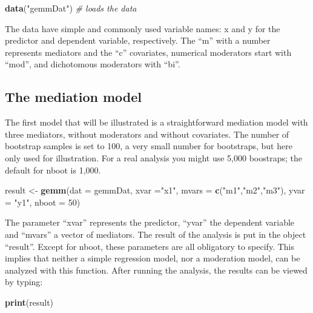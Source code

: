 \documentclass[man,floatsintext]{apa6}
\newenvironment{Shaded}{\begin{snugshade}}{\end{snugshade}}
\newcommand{\KeywordTok}[1]{\textcolor[rgb]{0.13,0.29,0.53}{\textbf{#1}}}
\newcommand{\DataTypeTok}[1]{\textcolor[rgb]{0.13,0.29,0.53}{#1}}
\newcommand{\DecValTok}[1]{\textcolor[rgb]{0.00,0.00,0.81}{#1}}
\newcommand{\StringTok}[1]{\textcolor[rgb]{0.31,0.60,0.02}{#1}}
\newcommand{\CommentTok}[1]{\textcolor[rgb]{0.56,0.35,0.01}{\textit{#1}}}
\newcommand{\NormalTok}[1]{#1}
\theoremstyle{definition}
\theoremstyle{definition}
\theoremstyle{definition}
\theoremstyle{remark}
\begin{document}
\begin{Shaded}
\begin{Highlighting}[]
\KeywordTok{data}\NormalTok{(}\StringTok{"gemmDat"}\NormalTok{)          }\CommentTok{# loads the data}
\end{Highlighting}
\end{Shaded}

The data have simple and commonly used variable names: x and y for the
predictor and dependent variable, respectively. The \enquote{m} with a
number represents mediators and the \enquote{c} covariates, numerical
moderators start with \enquote{mod}, and dichotomous moderators with
\enquote{bi}.

\subsection{The mediation model}\label{the-mediation-model}

The first model that will be illustrated is a straightforward mediation
model with three mediators, without moderators and without covariates.
The number of bootstrap samples is set to 100, a very small number for
bootstraps, but here only used for illustration. For a real analysis you
might use 5,000 boostraps; the default for nboot is 1,000.

\begin{Shaded}
\begin{Highlighting}[]
\NormalTok{result <-}\StringTok{ }\KeywordTok{gemm}\NormalTok{(}\DataTypeTok{dat =}\NormalTok{ gemmDat, }
               \DataTypeTok{xvar =}\StringTok{"x1"}\NormalTok{, }
               \DataTypeTok{mvars =} \KeywordTok{c}\NormalTok{(}\StringTok{"m1"}\NormalTok{,}\StringTok{"m2"}\NormalTok{,}\StringTok{"m3"}\NormalTok{),}
               \DataTypeTok{yvar =} \StringTok{"y1"}\NormalTok{,}
               \DataTypeTok{nboot =} \DecValTok{50}\NormalTok{)}
\end{Highlighting}
\end{Shaded}

The parameter \enquote{xvar} represents the predictor, \enquote{yvar}
the dependent variable and \enquote{mvars} a vector of mediators. The
result of the analysis is put in the object \enquote{result}. Except for
nboot, these parameters are all obligatory to specify. This implies that
neither a simple regression model, nor a moderation model, can be
analyzed with this function. After running the analysis, the results can
be viewed by typing:

\begin{Shaded}
\begin{Highlighting}[]
\KeywordTok{print}\NormalTok{(result)}
\end{Highlighting}
\end{Shaded}
\end{document}
